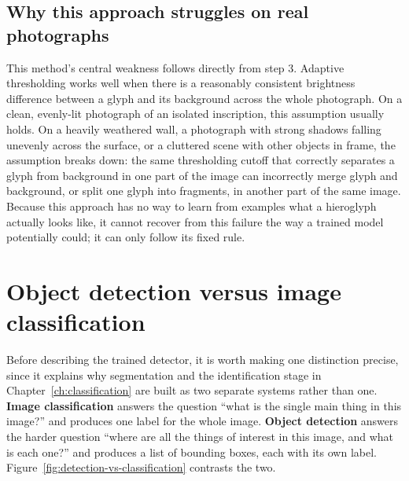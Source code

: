 \documentclass[11pt,a4paper]{report}
\begin{document}
\subsection*{Why this approach struggles on real photographs}

This method's central weakness follows directly from step 3. Adaptive
thresholding works well when there is a reasonably consistent brightness
difference between a glyph and its background across the whole photograph.
On a clean, evenly-lit photograph of an isolated inscription, this
assumption usually holds. On a heavily weathered wall, a photograph with
strong shadows falling unevenly across the surface, or a cluttered scene
with other objects in frame, the assumption breaks down: the same
thresholding cutoff that correctly separates a glyph from background in one
part of the image can incorrectly merge glyph and background, or split one
glyph into fragments, in another part of the same image. Because this
approach has no way to learn from examples what a hieroglyph actually looks
like, it cannot recover from this failure the way a trained model
potentially could; it can only follow its fixed rule.

\section{Object detection versus image classification}
\label{sec:detection-vs-classification}

Before describing the trained detector, it is worth making one distinction
precise, since it explains why segmentation and the identification stage in
Chapter~\ref{ch:classification} are built as two separate systems rather
than one. \textbf{Image classification} answers the question ``what is the
single main thing in this image?'' and produces one label for the whole
image. \textbf{Object detection} answers the harder question ``where are
all the things of interest in this image, and what is each one?'' and
produces a list of bounding boxes, each with its own label.
Figure~\ref{fig:detection-vs-classification} contrasts the two.
\end{document}

